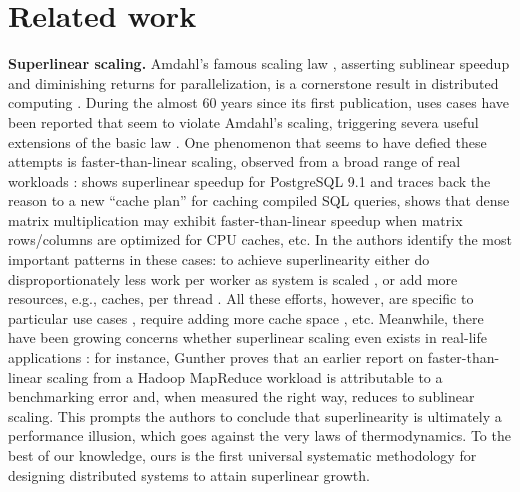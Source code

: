 \section{Related work}
\label{sec:related-work}

\noindent%
\textbf{Superlinear scaling.} %
Amdahl's famous scaling law \cite{10.1145/1465482.1465560}, asserting sublinear speedup and diminishing returns for parallelization, is a cornerstone result in distributed computing \cite{10.1145/42411.42415, 10.5555/775339.775386,1580395, 10.5555/1951599, 10.1145/42411.42415}. During the almost 60 years since its first publication, uses cases have been reported that seem to violate Amdahl's scaling, triggering severa useful extensions of the basic law \cite{4563876, 6280307, 406581, 6163449, 10.5555/1951599}. One phenomenon that seems to have defied these attempts is faster-than-linear scaling, observed from a broad range of real workloads \cite{scalability-analyzed, 10.5555/1012889.1012894, sdn-analytitcs, 556383, 7733347, 6483679, 10.1007/978-3-319-77610-1,dobb-1, dobb-2}: \cite{scalability-analyzed} shows superlinear speedup for PostgreSQL 9.1 and traces back the reason to a new ``cache plan'' for caching compiled SQL queries, \cite{7733347} shows that dense matrix multiplication may exhibit faster-than-linear speedup when matrix rows\slash columns are optimized for CPU caches, etc. In \cite{7733347, 80148} the authors identify the most important patterns in these cases: to achieve superlinearity either do disproportionately less work per worker as system is scaled \cite{7733347}, or add more resources, e.g., caches, per thread \cite{80148}. All these efforts, however, are specific to particular use cases \cite{556383}, require adding more cache space \cite{556383}, etc. Meanwhile, there have been growing concerns whether superlinear scaling even exists in real-life applications \cite{10.1016/0167-8191(86)90024-4}: for instance, Gunther proves that an earlier report on faster-than-linear scaling from a Hadoop MapReduce workload is attributable to a benchmarking error and, when measured the right way, reduces to sublinear scaling. This prompts the authors to conclude that superlinearity is ultimately a performance illusion, which goes against the very laws of thermodynamics. %
To the best of our knowledge, ours is the first universal systematic methodology for designing distributed systems to attain superlinear growth.

